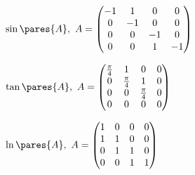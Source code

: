 \begin{multicols}{2}
\begin{enumtasks}
			\label{linsys_funcs:matrixA}
			\item \( \sin \pares{A}, ~ A = \begin{pmatrix} -1 & 1 & 0 & 0 \\ 0 & -1 & 0 & 0 \\ 0 & 0 & -1 & 0 \\ 0 & 0 & 1 & -1 \end{pmatrix} \) %
			\item \( \tan \pares{A}, ~ A = \begin{pmatrix} \frac{\pi}{4} & 1 & 0 & 0 \\ 0 & \frac{\pi}{4} & 1 & 0 \\ 0 & 0 & \frac{\pi}{4} & 0 \\ 0 & 0 & 0 & 0 \end{pmatrix} \) %
			\item \( \ln \pares{A}, ~ A = \begin{pmatrix} 1 & 0 & 0 & 0 \\ 1 & 1 & 0 & 0 \\ 0 & 1 & 1 & 0 \\ 0 & 0 & 1 & 1 \end{pmatrix} \) %

\end{enumtasks}
\end{multicols}
